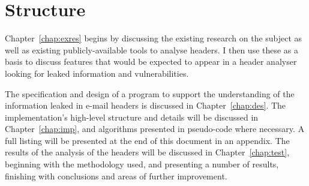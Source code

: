 \documentclass[a4paper,DIV=12,BCOR=7mm,abstract=yes,twoside,11pt]{scrreprt}
\begin{document}
\section{Structure}

Chapter~\ref{chap:exres} begins by discussing the existing research on
the subject as well as existing publicly-available tools to analyse
headers.  I then use these as a basis to discuss features that would be
expected to appear in a header analyser looking for leaked information
and vulnerabilities.

The specification and design of a program to support the understanding of the
information leaked in e-mail headers is discussed in Chapter~\ref{chap:des}.
The implementation's high-level structure and details will be discussed in
Chapter~\ref{chap:imp}, and algorithms presented in pseudo-code where
necessary.  A full listing will be presented at the end of this document in
an appendix. The results of the analysis of the headers will be discussed in
Chapter~\ref{chap:test}, beginning with the methodology used, and presenting
a number of results, finishing with conclusions and areas of further improvement.
\end{document}
